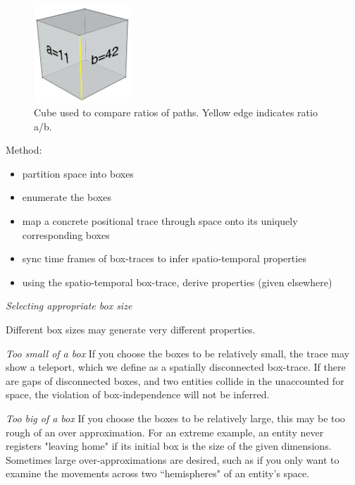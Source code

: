 \begin{figure}
  \centering
  \includegraphics[width=0.32\textwidth]{./figures/counting_cube.png}
  \caption{Cube used to compare ratios of paths.  Yellow edge indicates ratio a/b.}
  \label{fig:countingCube}
\end{figure}


Method:
\begin{itemize}
 \item partition space into boxes
 \item enumerate the boxes
 \item map a concrete positional trace through space onto its uniquely corresponding boxes
 \item sync time frames of box-traces to infer spatio-temporal properties
 \item using the spatio-temporal box-trace, derive properties (given elsewhere)
\end{itemize}

\emph{Selecting appropriate box size}

Different box sizes may generate very different properties.

\emph{Too small of a box} If you choose the boxes to be relatively small, the trace may show a teleport, which we define as a spatially disconnected box-trace.
If there are gaps of disconnected boxes, and two entities collide in the unaccounted for space, the violation of box-independence will not be inferred.

\emph{Too big of a box} If you choose the boxes to be relatively large, this may be too rough of an over approximation.
For an extreme example, an entity never registers "leaving home" if its initial box is the size of the given dimensions.
Sometimes large over-approximations are desired, such as if you only want to examine the movements across two ``hemispheres" of an entity's space.
